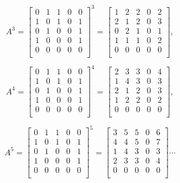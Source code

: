 \begin{alttitles}
\vspace{-.15in}
\begin{align*}
A^3 = 
\begin{bmatrix}
0 & 1 & 1 & 0 & 0 \\
1 & 0 & 1 & 0 & 1 \\
0 & 1 & 0 & 0 & 1 \\
1 & 0 & 0 & 0 & 1 \\
0 & 0 & 0 & 0 & 0 \\
\end{bmatrix}^3 =
\begin{bmatrix}
 1 &  2 &  2 &  0 &  2 \\
 2 &  1 &  2 &  0 &  3 \\
 0 &  2 &  1 &  0 &  1 \\
 1 &  1 &  1 &  0 &  2 \\
 0 &  0 &  0 &  0 &  0 \\
\end{bmatrix},\\
\end{align*}
\begin{align*}
A^4 = 
\begin{bmatrix}
0 & 1 & 1 & 0 & 0 \\
1 & 0 & 1 & 0 & 1 \\
0 & 1 & 0 & 0 & 1 \\
1 & 0 & 0 & 0 & 1 \\
0 & 0 & 0 & 0 & 0 \\
\end{bmatrix}^4 =
\begin{bmatrix}
 2 &  3 &  3 &  0 &  4 \\
 1 &  4 &  3 &  0 &  3 \\
 2 &  1 &  2 &  0 &  3 \\
 1 &  2 &  2 &  0 &  2 \\
 0 &  0 &  0 &  0 &  0 \\
\end{bmatrix},\\
\end{align*}
\begin{align*}
A^5 = 
\begin{bmatrix}
0 & 1 & 1 & 0 & 0 \\
1 & 0 & 1 & 0 & 1 \\
0 & 1 & 0 & 0 & 1 \\
1 & 0 & 0 & 0 & 1 \\
0 & 0 & 0 & 0 & 0 \\
\end{bmatrix}^5 =
\begin{bmatrix}
 3 &  5 &  5 &  0 &  6 \\
 4 &  4 &  5 &  0 &  7 \\
 1 &  4 &  3 &  0 &  3 \\
 2 &  3 &  3 &  0 &  4 \\
 0 &  0 &  0 &  0 &  0 \\
\end{bmatrix} \cdots
\end{align*}
\vspace{-.15in}


\end{alttitles}
